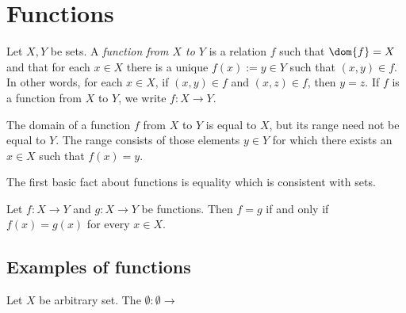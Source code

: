 \section{Functions}
\begin{comment}
\begin{definition}[Functions]
    Let $X, Y$ be sets, and let $P(x, y)$ be a property pertaining to an object $x \in X$ and an object $y \in Y$, such that for every $x \in X$, there is exactly one $y \in Y$ for which $P(x, y)$ is true. Then we define the \emph{function $f : X \to Y$ defined by $P$ on the domain $X$ and range $Y$} to be the object which, given any input $x \in X$, assigns an output $f(x) \in Y$, defined to be the unique object $f(x)$ for which $P(x, f(x))$ is true. Thus for any $x \in X$ and $y \in Y$,
    \begin{align*}
        y = f(x) \Longleftrightarrow P(x, y) \text{ is true}.
    \end{align*}
\end{definition}
\end{comment}

\begin{definition}[Functions]
    Let $X, Y$ be sets. A \emph{function from $X$ to $Y$} is a relation $f$ such that $\dom{f} = X$ and that for each $x \in X$ there is a unique $f(x) := y \in Y$ such that $(x, y) \in f$. In other words, for each $x \in X$, if $(x, y) \in f$ and $(x, z) \in f$, then $y = z$. If $f$ is a function from $X$ to $Y$, we write $f : X \to Y$.
\end{definition}

The domain of a function $f$ from $X$ to $Y$ is equal to $X$, but its range need not be equal to $Y$. The range consists of those elements $y \in Y$ for which there exists an $x \in X$ such that $f(x) = y$.

The first basic fact about functions is equality which is consistent with sets.

\begin{lemma}
    Let $f : X \to Y$ and $g : X \to Y$ be functions. Then $f = g$ if and only if $f(x) = g(x)$ for every $x \in X$.
\end{lemma}

\subsection*{Examples of functions}

\begin{example}
    Let $X$ be arbitrary set. The $\emptyset : \emptyset \to $
\end{example}


